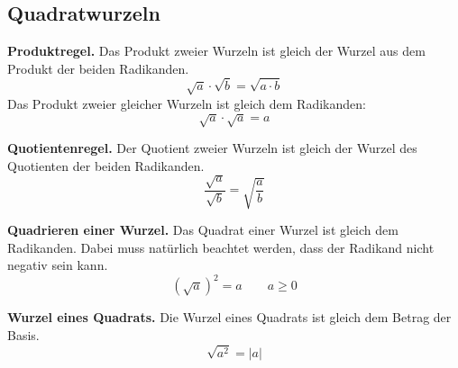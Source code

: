 \subsection{Quadratwurzeln}

\textbf{Produktregel.} Das Produkt zweier Wurzeln ist gleich der Wurzel aus dem Produkt der beiden Radikanden.
\[
  \sqrt{a}\cdot\sqrt{b} = \sqrt{a\cdot b}
\]
Das Produkt zweier gleicher Wurzeln ist gleich dem Radikanden:
\[
  \sqrt{a}\cdot\sqrt{a} = a
\]

\textbf{Quotientenregel.} Der Quotient zweier Wurzeln ist gleich der Wurzel des Quotienten der beiden Radikanden.
\[
  \frac{\sqrt{a}}{\sqrt{b}} = \sqrt{\frac{a}{b}}
\]

\textbf{Quadrieren einer Wurzel.} Das Quadrat einer Wurzel ist gleich dem Radikanden. Dabei muss natürlich beachtet werden, dass der Radikand nicht negativ sein kann.
\[
  \left(\sqrt{a}\right)^{2} = a \qquad a\ge 0
\]

\textbf{Wurzel eines Quadrats.} Die Wurzel eines Quadrats ist gleich dem Betrag der Basis.
\[
  \sqrt{a^{2}} = |a|
\]
